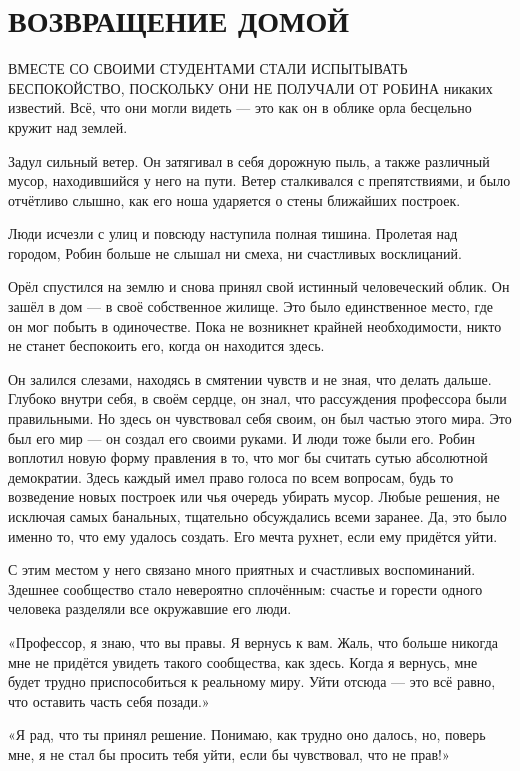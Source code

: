 \documentclass[a4paper,12pt]{book}
\begin{document}
\chapter{ВОЗВРАЩЕНИЕ ДОМОЙ}
\noindent{} ВМЕСТЕ СО СВОИМИ СТУДЕНТАМИ СТАЛИ ИСПЫТЫВАТЬ БЕСПОКОЙСТВО, ПОСКОЛЬКУ ОНИ НЕ ПОЛУЧАЛИ ОТ РОБИНА никаких известий. Всё, что они могли видеть — это как он в облике орла бесцельно кружит над землей.
\par
Задул сильный ветер. Он затягивал в себя дорожную пыль, а также различный мусор, находившийся у него на пути. Ветер сталкивался с препятствиями, и было отчётливо слышно, как его ноша ударяется о стены ближайших построек.
\par
Люди исчезли с улиц и повсюду наступила полная тишина. Пролетая над городом, Робин больше не слышал ни смеха, ни счастливых восклицаний.
\par
Орёл спустился на землю и снова принял свой истинный человеческий облик. Он зашёл в дом — в своё собственное жилище. Это было единственное место, где он мог побыть в одиночестве. Пока не возникнет крайней необходимости, никто не станет беспокоить его, когда он находится здесь.
\par
Он залился слезами, находясь в смятении чувств и не зная, что делать дальше. Глубоко внутри себя, в своём сердце, он знал, что рассуждения профессора были правильными. Но здесь он чувствовал себя своим, он был частью этого мира. Это был его мир — он создал его своими руками. И люди тоже были его. Робин воплотил новую форму правления в то, что мог бы считать сутью абсолютной демократии. Здесь каждый имел право голоса по всем вопросам, будь то возведение новых построек или чья очередь убирать мусор. Любые решения, не исключая самых банальных, тщательно обсуждались всеми заранее. Да, это было именно то, что ему удалось создать. Его мечта рухнет, если ему придётся уйти.
\par
С этим местом у него связано много приятных и счастливых воспоминаний. Здешнее сообщество стало невероятно сплочённым: счастье и горести одного человека разделяли все окружавшие его люди.
\par
«Профессор, я знаю, что вы правы. Я вернусь к вам. Жаль, что больше никогда мне не придётся увидеть такого сообщества, как здесь. Когда я вернусь, мне будет трудно приспособиться к реальному миру. Уйти отсюда — это всё равно, что оставить часть себя позади.»
\par
«Я рад, что ты принял решение. Понимаю, как трудно оно далось, но, поверь мне, я не стал бы просить тебя уйти, если бы чувствовал, что не прав!»
\end{document}
